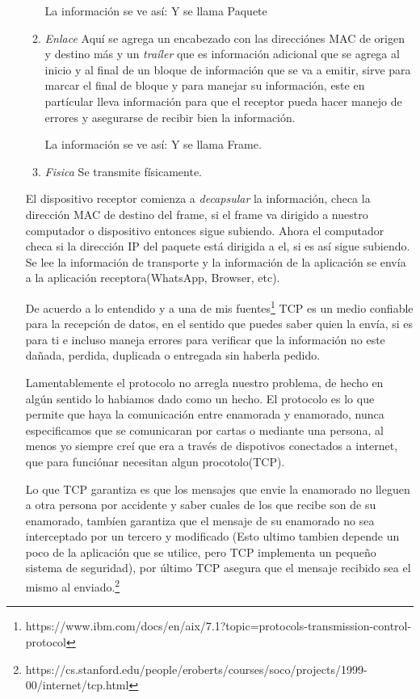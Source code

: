 \documentclass[8pt, letterpaper]{article}
\begin{document}
\begin{enumerate}
\begin{enumerate}
        \hfill\break
        La información se ve así:
        \hfill\break
        [IP][TCP][DATA]
        Y se llama Paquete
      \item[2.] \textit{Enlace}
        \hfill\break
        Aquí se agrega un encabezado con las direcciónes MAC de origen y destino
        más y un \textit{traíler} que es información adicional que se agrega
        al inicio y al final de un bloque de información que se va a emitir,
        sirve para marcar el final de bloque y para manejar su información,
        este en partícular lleva información para que el receptor pueda
        hacer manejo de errores y asegurarse de recibir bien la información. 

        \hfill\break
        La información se ve así:
        \hfill\break
        [ETHERNET][IP][TCP][DATA][ETHERNET]
        Y se llama Frame.
      \item[1.]\textit{Fisica}
        \hfill\break
        Se transmite físicamente.
      \end{enumerate}
      
      El dispositivo receptor comienza a \textit{decapsular} la información,
      checa la dirección MAC de destino del frame, si el frame va dirigido
      a nuestro computador o dispositivo entonces sigue subiendo.
      Ahora el computador checa si la dirección IP del paquete está dirigida
      a el, si es así sigue subiendo.
      Se lee la información de transporte y la información de la aplicación se
      envía a la aplicación receptora(WhatsApp, Browser, etc).

      \hfill\break
      De acuerdo a lo entendido y a una de mis
      fuentes\footnote{https://www.ibm.com/docs/en/aix/7.1?topic=protocols-transmission-control-protocol}
      TCP es un medio confiable para la recepción de datos, en el sentido
      que puedes saber quien la envía, si es para ti e incluso maneja errores
      para verificar que la información no este dañada, perdida, duplicada o
      entregada sin haberla pedido.

      \hfill\break
      Lamentablemente el protocolo no arregla nuestro problema, de hecho
      en algún sentido lo habiamos dado como un hecho. El protocolo es lo que
      permite que haya la comunicación entre enamorada y enamorado, nunca
      especificamos que se comunicaran por cartas o mediante una persona,
      al menos yo siempre creí que era a través de dispotivos conectados
      a internet, que para funciónar necesitan algun procotolo(TCP).

      \hfill\break
      Lo que TCP garantiza es que los mensajes que envie la enamorado no
      lleguen a otra  persona por accidente y saber cuales de los que recibe
      son de su enamorado, tambíen garantiza que el mensaje de su enamorado
      no sea interceptado por un tercero y modificado (Esto ultimo tambien
      depende un poco de la aplicación que se utilice, pero TCP implementa
      un pequeño sistema de seguridad), por último TCP asegura que el mensaje
      recibido sea el mismo al enviado.\footnote{https://cs.stanford.edu/people/eroberts/courses/soco/projects/1999-00/internet/tcp.html}


\end{enumerate}
\end{document}
